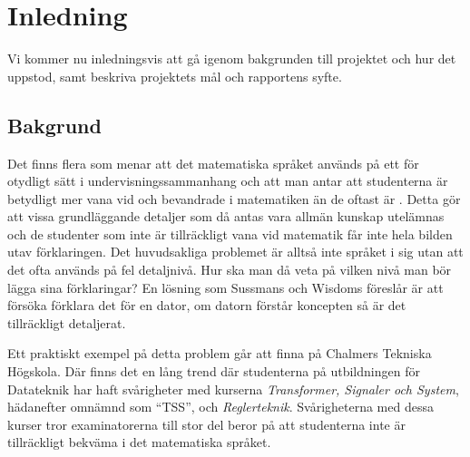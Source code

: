 \documentclass[]{article}
\begin{document}
\newpage
\tableofcontents

\newpage

\printglossary[title=Ordlista,nonumberlist]

\newpage

\setlength{\parskip}{2mm}
\setlength{\parindent}{0pt}


\section{Inledning}
Vi kommer nu inledningsvis att gå igenom bakgrunden till projektet och hur det
uppstod, samt beskriva projektets mål och rapportens syfte.

\subsection{Bakgrund}
%

Det finns flera som menar att det matematiska språket används på ett för
otydligt sätt i undervisningssammanhang och att man antar att studenterna
är betydligt mer vana vid och bevandrade i matematiken än de oftast är \cite{sussman2002role} \cite{wells1995communicating}.
Detta gör att vissa grundläggande detaljer som då antas vara allmän kunskap
utelämnas och de studenter som inte är tillräckligt vana vid matematik får inte
hela bilden utav förklaringen.
Det huvudsakliga problemet är alltså inte språket i sig utan att det ofta
används på fel detaljnivå. Hur ska man då veta på vilken nivå man bör lägga
sina förklaringar? En lösning som Sussmans och Wisdoms föreslår är att
försöka förklara det för en dator, om datorn förstår koncepten så är det
tillräckligt detaljerat.

Ett praktiskt exempel på detta problem går att finna på Chalmers Tekniska Högskola.
Där finns det en lång trend där studenterna på utbildningen för Datateknik har
haft svårigheter med kurserna \textit{Transformer, Signaler och System}, hädanefter
omnämnd som ``\gls{TSS}'', och \textit{Reglerteknik}.
Svårigheterna med dessa kurser tror examinatorerna till stor del beror på att
studenterna inte är tillräckligt bekväma i det matematiska språket.
\end{document}
